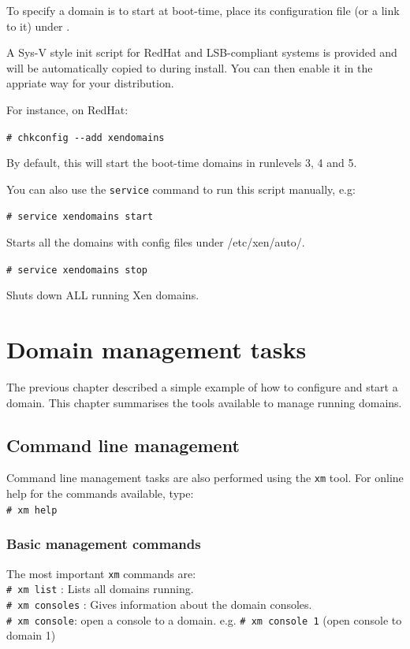 \documentclass[11pt,twoside,final,openright]{xenstyle}
\begin{document}
To specify a domain is to start at boot-time, place its
configuration file (or a link to it) under .

A Sys-V style init script for RedHat and LSB-compliant systems is
provided and will be automatically copied to 
during install.  You can then enable it in the appriate way for your
distribution.

For instance, on RedHat:

\verb_# chkconfig --add xendomains_

By default, this will start the boot-time domains in runlevels 3, 4
and 5.

You can also use the {\tt service} command to run this script manually, e.g:

\verb_# service xendomains start_

Starts all the domains with config files under /etc/xen/auto/.

\verb_# service xendomains stop_

Shuts down ALL running Xen domains.


\chapter{Domain management tasks}

The previous chapter described a simple example of how to configure
and start a domain.  This chapter summarises the tools available to
manage running domains.

\section{Command line management}

Command line management tasks are also performed using the {\tt xm}
tool.  For online help for the commands available, type:\\
\verb_# xm help_

\subsection{Basic management commands}

The most important {\tt xm} commands are: \\
\verb_# xm list_ : Lists all domains running. \\
\verb_# xm consoles_ : Gives information about the domain consoles. \\
\verb_# xm console_: open a console to a domain.
e.g. \verb_# xm console 1_ (open console to domain 1)
\end{document}
